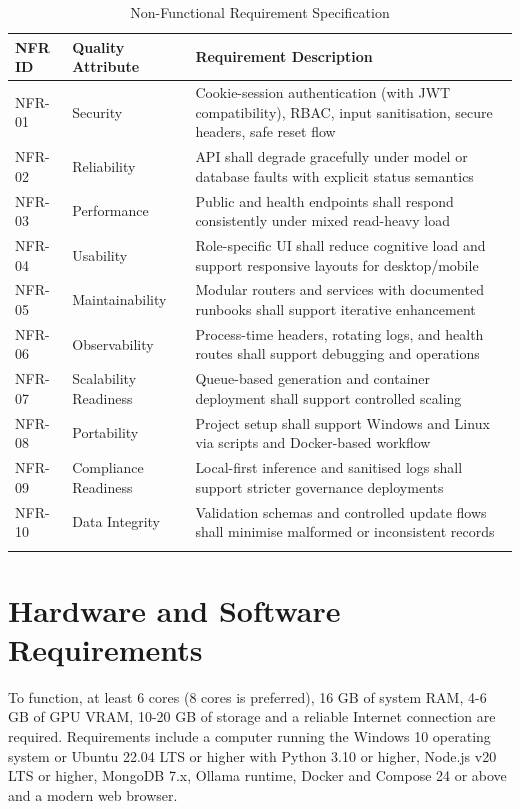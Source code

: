 \begin{xltabular}{\textwidth}{|>{\RaggedRight\arraybackslash}p{0.12\textwidth}|>{\RaggedRight\arraybackslash}p{0.30\textwidth}|>{\RaggedRight\arraybackslash}X|}
\hline
\textbf{NFR ID} & \textbf{Quality Attribute} & \textbf{Requirement Description} \\ \hline
\endhead
NFR-01 & Security & Cookie-session authentication (with JWT compatibility), RBAC, input sanitisation, secure headers, safe reset flow \\ \hline
NFR-02 & Reliability & API shall degrade gracefully under model or database faults with explicit status semantics \\ \hline
NFR-03 & Performance & Public and health endpoints shall respond consistently under mixed read-heavy load \\ \hline
NFR-04 & Usability & Role-specific UI shall reduce cognitive load and support responsive layouts for desktop/mobile \\ \hline
NFR-05 & Maintainability & Modular routers and services with documented runbooks shall support iterative enhancement \\ \hline
NFR-06 & Observability & Process-time headers, rotating logs, and health routes shall support debugging and operations \\ \hline
NFR-07 & Scalability Readiness & Queue-based generation and container deployment shall support controlled scaling \\ \hline
NFR-08 & Portability & Project setup shall support Windows and Linux via scripts and Docker-based workflow \\ \hline
NFR-09 & Compliance Readiness & Local-first inference and sanitised logs shall support stricter governance deployments \\ \hline
NFR-10 & Data Integrity & Validation schemas and controlled update flows shall minimise malformed or inconsistent records \\ \hline
\caption{Non-Functional Requirement Specification}
\end{xltabular}

\section{Hardware and Software Requirements}

To function, at least 6 cores (8 cores is preferred), 16 GB of system RAM, 4-6 GB of GPU VRAM, 10-20 GB of storage and a reliable Internet connection are required. Requirements include a computer running the Windows 10 operating system or Ubuntu 22.04 LTS or higher with Python 3.10 or higher, Node.js v20 LTS or higher, MongoDB 7.x, Ollama runtime, Docker and Compose 24 or above and a modern web browser.

